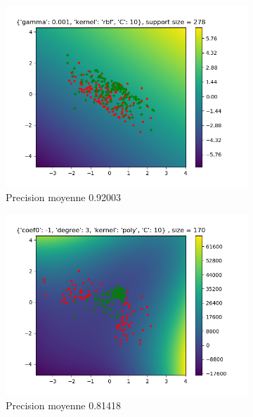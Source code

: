 \documentclass[a4paper,12pt]{article}
\begin{document}
\begin{figure}[h!]
\caption{Les données artifiel et ses vecteurs supports, trouvée par GridSearchCV (validation croisée de cinq fois)}
\label{fig:tme5_swm_grid}
\begin{subfigure}{.33\textwidth}
	\centering
	\includegraphics[width=\linewidth]{images/tme5/grid_arti.png}
	\caption{Precision moyenne 0.92003}
\end{subfigure}%
\begin{subfigure}{.33\textwidth}
  \centering
	\includegraphics[width=\linewidth]{images/tme5/grid_arti2.png}
	\caption{Precision moyenne 0.81418}
\end{subfigure}
\begin{subfigure}{.33\textwidth}

\end{subfigure}
\end{figure}
\end{document}
